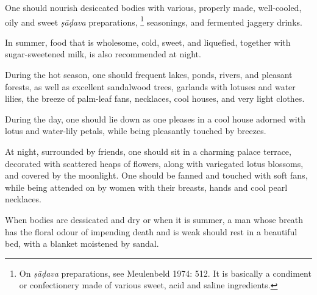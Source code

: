 \begin{translation}
\item[54]
One should nourish %
desiccated bodies %
with various, properly made, %
well-cooled, %
oily and sweet %
\emph{ṣāḍava} preparations, %
    \footnote{On \emph{ṣāḍava} preparations, see Meulenbeld 1974: 512. It is basically a condiment or confectionery made of various sweet, acid and saline ingredients.}
seasonings, %
and fermented jaggery drinks. %

\item[55]
In summer, food that is wholesome, cold, sweet, and liquefied, %
together with sugar-sweetened milk, %
is also recommended at night.

\item[56--57]
During the hot season, one should frequent lakes, ponds, %
rivers, and pleasant forests, as well as excellent sandalwood trees, %
garlands with lotuses and water lilies, %
the breeze of palm-leaf fans,  %
necklaces, %
cool houses, %
and very light clothes. 

\item[58]
During the day, one should lie down as one pleases %
in a cool house adorned with lotus and water-lily petals, %
while being pleasantly touched by breezes. %

\item[59--60]
At night, surrounded by friends, %
one should sit in a charming %
palace terrace, %
decorated with scattered heaps %
of flowers, along with variegated lotus blossoms, %
and covered by the moonlight.
One should be fanned and touched with soft fans, %
while being attended on by women %
with their breasts, hands and cool pearl necklaces.

\item[61] %
When bodies are dessicated and dry or when it is summer, %
a man whose breath has the floral odour of impending death  %
and is weak %
should rest in a beautiful bed, with a blanket moistened by sandal. %


\end{translation}
